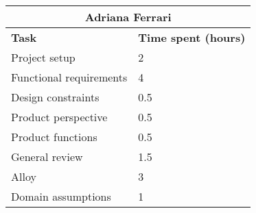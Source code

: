 \begin{table}[h]
  \center
  \begin{tabular}{l|l}
    \multicolumn{2}{c}{\textbf{Adriana Ferrari}} \\
    \hline
    \textbf{Task} & \textbf{Time spent (hours)}\\
    \hline
    Project setup & 2 \\
    Functional requirements & 4 \\
    Design constraints & 0.5 \\
    Product perspective & 0.5 \\
    Product functions & 0.5 \\
    General review & 1.5 \\
    Alloy & 3 \\
    Domain assumptions & 1 \\
  \end{tabular}
\end{table}